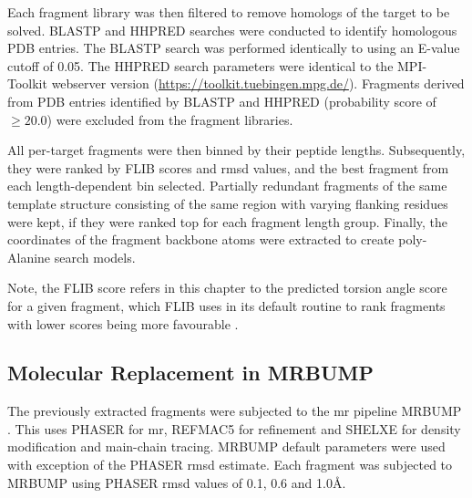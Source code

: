Each fragment library was then filtered to remove homologs of the target to be solved. BLASTP and HHPRED \cite{Soding2005-sx} searches were conducted to identify homologous PDB entries. The BLASTP search was performed identically to \textcite{De_Oliveira2015-ba} using an E-value cutoff of 0.05. The HHPRED search parameters were identical to the MPI-Toolkit \cite{Biegert2006-ny} webserver version (\url{https://toolkit.tuebingen.mpg.de/}). Fragments derived from PDB entries identified by BLASTP and HHPRED (probability score of $\geq20.0$) were excluded from the fragment libraries.

All per-target fragments were then binned by their peptide lengths. Subsequently, they were ranked by FLIB scores and \gls{rmsd} values, and the best fragment from each length-dependent bin selected. Partially redundant fragments of the same template structure consisting of the same region with varying flanking residues were kept, if they were ranked top for each fragment length group. Finally, the coordinates of the fragment backbone atoms were extracted to create poly-Alanine search models.

Note, the FLIB score refers in this chapter to the predicted torsion angle score for a given fragment, which FLIB uses in its default routine to rank fragments with lower scores being more favourable \cite{De_Oliveira2015-ba}. 

\subsection{Molecular Replacement in MRBUMP}
The previously extracted fragments were subjected to the \gls{mr} pipeline MRBUMP \cite{Keegan2008-hk}. This uses PHASER \cite{McCoy2007-bf} for \gls{mr}, REFMAC5 \cite{Murshudov2011-we} for refinement and SHELXE \cite{Thorn2013-ir} for density modification and main-chain tracing. MRBUMP default parameters were used with exception of the PHASER \gls{rmsd} estimate. Each fragment was subjected to MRBUMP using PHASER \gls{rmsd} values of 0.1, 0.6 and 1.0\AA.

